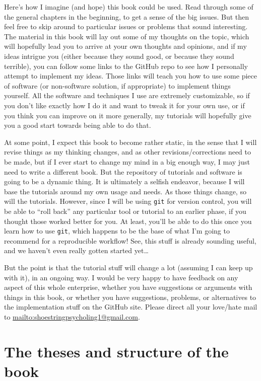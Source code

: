 \documentclass{book}
\begin{document}
Here's how I imagine (and hope) this book could be used.  Read through some of the general chapters in the beginning, to get a sense of the big issues.  But then feel free to skip around to particular issues or problems that sound interesting.  The material in this book will lay out some of my thoughts on the topic, which will hopefully lead you to arrive at your own thoughts and opinions, and if my ideas intrigue you (either because they sound good, or because they sound terrible), you can follow some links to the GitHub repo to see how I personally attempt to implement my ideas. Those links will teach you how to use some piece of software (or non-software solution, if appropriate) to implement things yourself.  All the software and techniques I use are extremely customizable, so if you don't like exactly how I do it and want to tweak it for your own use, or if you think you can improve on it more generally, my tutorials will hopefully give you a good start towards being able to do that.

At some point, I expect this book to become rather static, in the sense that I will revise things as my thinking changes, and as other revisions/corrections need to be made, but if I ever start to change my mind in a big enough way, I may just need to write a different book.  But the repository of tutorials and software is going to be a dynamic thing.  It is ultimately a selfish endeavor, because I will base the tutorials around my own usage and needs.  As those things change, so will the tutorials.  However, since I will be using \texttt{git} for version control, you will be able to ``roll back'' any particular tool or tutorial to an earlier phase, if you thought those worked better for you. At least, you'll be able to do this once you learn how to use \texttt{git}, which happens to be the base of what I'm going to recommend for a reproducible workflow! See, this stuff is already sounding useful, and we haven't even really gotten started yet\ldots{}

But the point is that the tutorial stuff will change a lot (assuming I can keep up with it), in an ongoing way.  I would be very happy to have feedback on any aspect of this whole enterprise, whether you have suggestions or arguments with things in this book, or whether you have suggestions, problems, or alternatives to the implementation stuff on the GitHub site.  Please direct all your love/hate mail to \href{mailto:shoestringpsycholing1@gmail.com}{mailto:shoestringpsycholing1@gmail.com}.
\section{The theses and structure of the book}
\label{sec-1-4}
\end{document}
